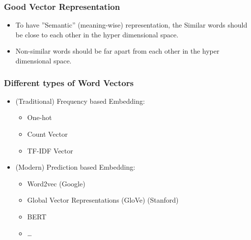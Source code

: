 \begin{frame}[fragile]\frametitle{Good Vector Representation}
\begin{itemize}
\item To have ''Semantic'' (meaning-wise) representation, the Similar words should be close to each other in the hyper dimensional space.
\item Non-similar words should be far apart from each other in the hyper dimensional space.
\end{itemize}
\end{frame}


\begin{frame}[fragile]\frametitle{Different types of Word Vectors}
\begin{itemize}
\item (Traditional) Frequency based Embedding:
\begin{itemize}
\item One-hot
\item Count Vector
\item TF-IDF Vector
\end{itemize}
\item (Modern) Prediction based Embedding:
\begin{itemize}
\item Word2vec  (Google)
\item Global Vector Representations (GloVe)   (Stanford)
\item BERT
\item \ldots
\end{itemize}
\end{itemize}
\end{frame}


